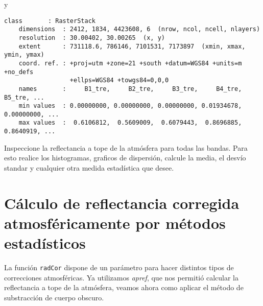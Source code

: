 \begin{exa}
    y

    \begin{Verbatim}[fontsize=\small]
    class       : RasterStack
    dimensions  : 2412, 1834, 4423608, 6  (nrow, ncol, ncell, nlayers)
    resolution  : 30.00402, 30.00265  (x, y)
    extent      : 731118.6, 786146, 7101531, 7173897  (xmin, xmax, ymin, ymax)
    coord. ref. : +proj=utm +zone=21 +south +datum=WGS84 +units=m +no_defs
                  +ellps=WGS84 +towgs84=0,0,0
    names       :     B1_tre,     B2_tre,     B3_tre,     B4_tre,     B5_tre, ...
    min values  : 0.00000000, 0.00000000, 0.00000000, 0.01934678, 0.00000000, ...
    max values  :  0.6106812,  0.5609009,  0.6079443,  0.8696885,  0.8640919, ...
    \end{Verbatim}

    \end{exa}

\begin{act}
    Inspeccione la reflectancia a tope de la atm\'osfera para todas las bandas.
    Para esto realice los histogramas, graficos de dispersi\'on, calcule la media,
    el desv\'io standar y cualquier otra medida estad\'istica que desee.
\end{act}
\section{C\'alculo de reflectancia corregida atmosf\'ericamente por m\'etodos
            estad\'isticos}

La funci\'on \texttt{radCor} dispone de un par\'ametro para hacer distintos
tipos de correcciones atmosf\'ericas. Ya utilizamos \emph{apref}, que nos permiti\'o
calcular la reflectancia a tope de la atm\'osfera, veamos ahora como aplicar el m\'etodo
de substracci\'on de cuerpo obscuro.

